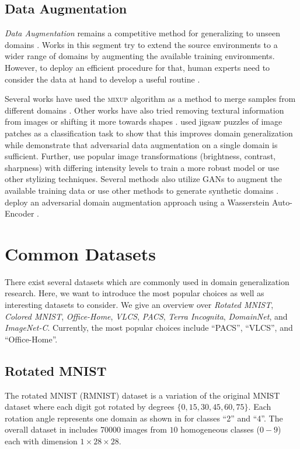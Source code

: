 \subsection{Data Augmentation}
\emph{Data Augmentation} remains a competitive method for generalizing to unseen domains \citep{zhang2019unseen}. Works in this segment try to extend the source environments to a wider range of domains by augmenting the available training environments. However, to deploy an efficient procedure for that, human experts need to consider the data at hand to develop a useful routine \citep{gulrajani2020search}.

Several works have used the \textsc{mixup} \citep{ZhangCDL18} algorithm as a method to merge samples from different domains \citep{XuZNLWTZ20, yan2020improve, WangLK20, mancini2020}. Other works have also tried removing textural information from images \citep{WangHLX19} or shifting it more towards shapes \citep{nam2019reducing, asadi2019shape}. \citet{CarlucciDBCT19} used jigsaw puzzles of image patches as a classification task to show that this improves domain generalization while \citet{VolpiNSDMS18} demonstrate that adversarial data augmentation on a single domain is sufficient. Further, \citet{VolpiM19} use popular image transformations (\eg brightness, contrast, sharpness) with differing intensity levels to train a more robust model or \citet{somavarapu2020frustratingly} use other stylizing techniques. Several methods also utilize GANs to augment the available training data  \citep{RahmanFBS19, ZhouYHX20, ShankarPCCJS18} or use other methods to generate synthetic domains \citep{zhou2020learning}. \citet{QiaoZP20} deploy an adversarial domain augmentation approach using a Wasserstein Auto-Encoder \citep{TolstikhinBGS18}.

\section{Common Datasets}
There exist several datasets which are commonly used in domain generalization research. Here, we want to introduce the most popular choices as well as interesting datasets to consider. We give an overview over \emph{Rotated MNIST}, \emph{Colored MNIST}, \emph{Office-Home}, \emph{VLCS}, \emph{PACS}, \emph{Terra Incognita}, \emph{DomainNet}, and \emph{ImageNet-C}. Currently, the most popular choices include ``PACS'', ``VLCS'', and ``Office-Home''.

\subsection{Rotated MNIST}
The rotated MNIST (RMNIST) dataset \citep{GhifaryKZB15} is a variation of the original MNIST dataset \citep{lecun-mnisthandwrittendigit-2010} where each digit got rotated by degrees $\{0, 15, 30, 45, 60, 75\}$. Each rotation angle represents one domain as shown in  for classes ``2'' and ``4''. The overall dataset in \citet{gulrajani2020search} includes \num{70000} images from $10$ homogeneous classes ($0-9$) each with dimension $1\times28\times28$.

